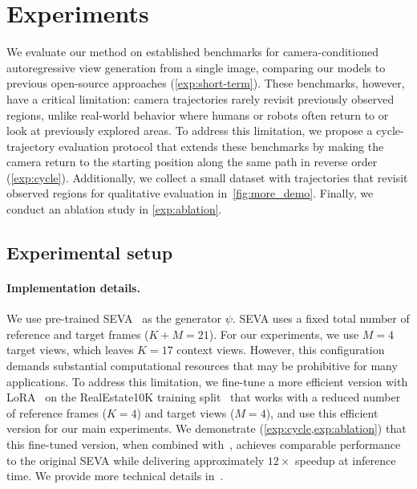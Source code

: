 



\section{Experiments}%
\label{sec:experiments}

We evaluate our method on established benchmarks for camera-conditioned autoregressive view generation from a single image, comparing our models to previous open-source approaches (\cref{exp:short-term}).
These benchmarks, however, have a critical limitation: camera trajectories rarely revisit previously observed regions, unlike real-world behavior where humans or robots often return to or look at previously explored areas.
To address this limitation, we propose a cycle-trajectory evaluation protocol that extends these benchmarks by making the camera return to the starting position along the same path in reverse order (\cref{exp:cycle}).
Additionally, we collect a small dataset with trajectories that revisit observed regions for qualitative evaluation in~\cref{fig:more_demo}.
Finally, we conduct an ablation study in \cref{exp:ablation}.

\subsection{Experimental setup}%
\label{sec:experimental_setup}

\paragraph{Implementation details.}%
We use pre-trained SEVA~\cite{seva} as the generator $\psi$.
SEVA uses a fixed total number of reference and target frames ($K+M=21$).
For our experiments, we use $M=4$ target views, which leaves $K=17$ context views.
However, this configuration demands substantial computational resources that may be prohibitive for many applications.
To address this limitation, we fine-tune a more efficient version with LoRA~\cite{hu22lora:} on the RealEstate10K training split~\cite{realestate} that works with a reduced number of reference frames ($K=4$) and target views ($M=4$), and use this efficient version for our main experiments.
We demonstrate (\cref{exp:cycle,exp:ablation}) that this fine-tuned version, when combined with~\mname, achieves comparable performance to the original SEVA while delivering approximately $12\times$ speedup at inference time.
We provide more technical details in~.

